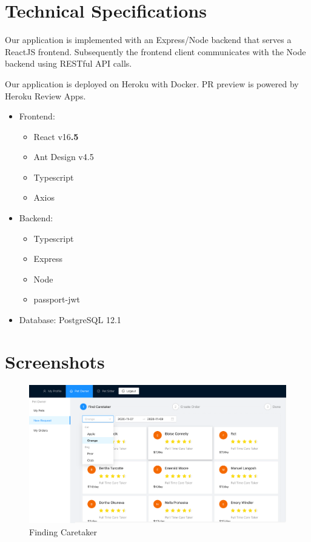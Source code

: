 \documentclass[
  paper=a4,
  ,captions=tableheading
]{scrartcl}
\providecommand{\tightlist}{%
  \setlength{\itemsep}{0pt}\setlength{\parskip}{0pt}}
\begin{document}
\hypertarget{technical-specifications}{%
\section{Technical Specifications}\label{technical-specifications}}

Our application is implemented with an Express/Node backend that serves
a ReactJS frontend. Subsequently the frontend client communicates with
the Node backend using RESTful API calls.

Our application is deployed on Heroku with Docker. PR preview is powered
by Heroku Review Apps.

\begin{itemize}
\tightlist
\item
  Frontend:

  \begin{itemize}
  \tightlist
  \item
    React v16\textbf{.5}
  \item
    Ant Design v4.5
  \item
    Typescript
  \item
    Axios
  \end{itemize}
\item
  Backend:

  \begin{itemize}
  \tightlist
  \item
    Typescript
  \item
    Express
  \item
    Node
  \item
    passport-jwt
  \end{itemize}
\item
  Database: PostgreSQL 12.1
\end{itemize}

\hypertarget{screenshots}{%
\section{Screenshots}\label{screenshots}}

\begin{figure}
\centering
\includegraphics{find-caretaker.png}
\caption{Finding Caretaker}
\end{figure}
\end{document}
